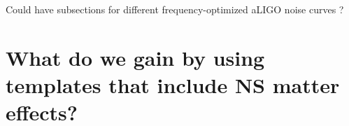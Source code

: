 \documentclass[aps,prd,amsmath,floats,floatfix, twocolumn,
superscriptaddress,nofootinbib,showpacs]{revtex4-1}
\newcommand{\prayush}{\textcolor{red!40!black}}
\begin{document}
\prayush{Could have subsections for different frequency-optimized aLIGO noise curves ?}

\hspace{5mm}






\section{What do we gain by using templates that include NS matter effects?}
% 
\end{document}
